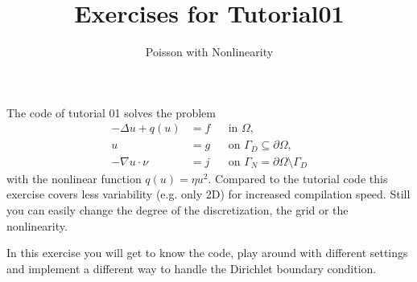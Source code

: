 \documentclass[12pt,a4paper]{article}
\title{\textbf{Exercises for Tutorial01}}
\subtitle{Poisson with Nonlinearity}
\begin{document}
\exerciseheader

The code of tutorial 01 solves the problem
\begin{align*}
  -\Delta u + q(u) &= f &&\text{in $\Omega$},\\
  u &= g &&\text{on $\Gamma_D\subseteq\partial\Omega$},\\
  -\nabla u\cdot \nu &= j &&\text{on $\Gamma_N=\partial\Omega\setminus\Gamma_D$}
\end{align*}
with the nonlinear function $q(u)=\eta u^2$.  Compared to the tutorial
code this exercise covers less variability (e.g. only 2D) for
increased compilation speed. Still you can easily change the degree of
the discretization, the grid or the nonlinearity.

In this exercise you will get to know the code, play around with
different settings and implement a different way to handle the
Dirichlet boundary condition.
\end{document}
